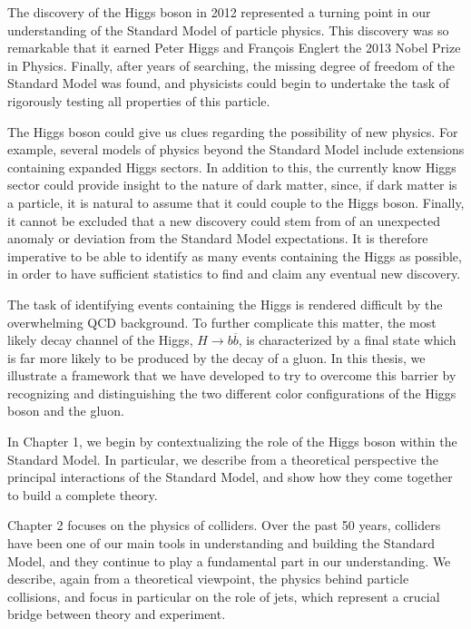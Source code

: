\documentclass[10pt,a4paper]{book}
\begin{document}
The discovery of the Higgs boson in 2012 represented a turning point in our understanding of the Standard Model of particle physics. This discovery was so remarkable that it earned Peter Higgs and Fran\c{c}ois Englert the 2013 Nobel Prize in Physics. Finally, after years of searching, the missing degree of freedom of the Standard Model was found, and physicists could begin to undertake the task of rigorously testing all properties of this particle.

The Higgs boson could give us clues regarding the possibility of new physics. For example, several models of physics beyond the Standard Model include extensions containing expanded Higgs sectors. In addition to this, the currently know Higgs sector could provide insight to the nature of dark matter, since, if dark matter is a particle, it is natural to assume that it could couple to the Higgs boson.  Finally, it cannot be excluded that a new discovery could stem from of an unexpected anomaly or deviation from the Standard Model expectations. It is therefore imperative to be able to identify as many events containing the Higgs as possible, in order to have sufficient statistics to find and claim any eventual new discovery.

The task of identifying events containing the Higgs is rendered difficult by the overwhelming QCD background. To further complicate this matter, the most likely decay channel of the Higgs, $H\rightarrow b\overline{b}$, is characterized by a final state which is far more likely to be produced by the decay of a gluon. In this thesis, we illustrate a framework that we have developed to try to overcome this barrier by recognizing and distinguishing the two different color configurations of the Higgs boson and the gluon.

In Chapter 1, we begin by contextualizing the role of the Higgs boson within the Standard Model. In particular, we describe from a theoretical perspective the principal interactions of the Standard Model, and show how they come together to build a complete theory.

Chapter 2 focuses on the physics of colliders. Over the past 50 years, colliders have been one of our main tools in understanding and building the Standard Model, and they continue to play a fundamental part in our understanding. We describe, again from a theoretical viewpoint, the physics behind particle collisions, and focus in particular on the role of jets, which represent a crucial bridge between theory and experiment.
\end{document}
